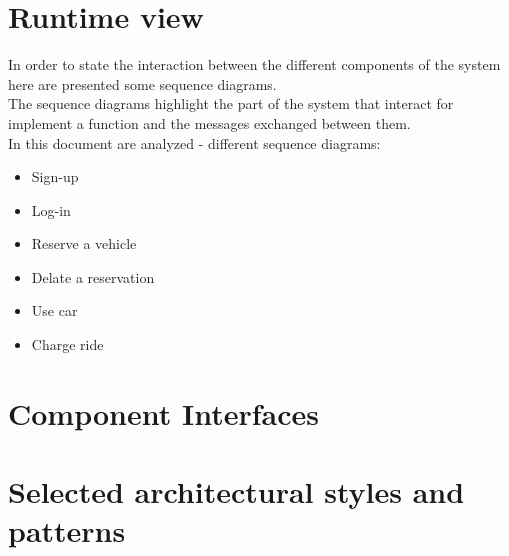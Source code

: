 
\section{Runtime view}

In order to state the interaction between the different components of the system here are presented some sequence diagrams.
\\The sequence diagrams highlight the part of the system that interact for implement a function and the messages exchanged between them.
\\In this document are analyzed - different sequence diagrams: %
\begin{itemize}%
	\item Sign-up
	\item Log-in
	\item Reserve a vehicle
	\item Delate a reservation
	\item Use car
	\item Charge ride
\end{itemize} 



 \section{Component Interfaces}
 	\blindtext
 \section{Selected architectural styles and patterns}
